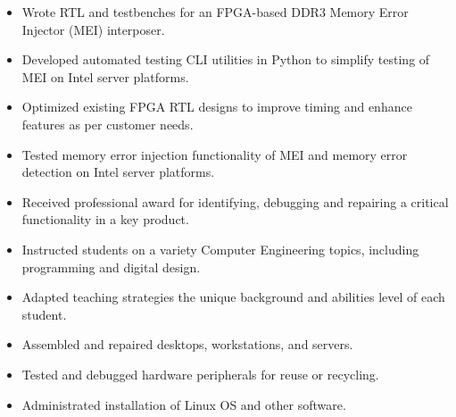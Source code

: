 \documentclass{article}
\begin{document}
\vspace{3pt}


	\begin{itemize}\setlength{\itemsep}{-4pt}
		\item Wrote RTL and testbenches for an FPGA-based DDR3 Memory Error Injector (MEI) interposer.
		\item Developed automated testing CLI utilities in Python to simplify testing of MEI on Intel server platforms.
		\item Optimized existing FPGA RTL designs to improve timing and enhance features as per customer needs.
		\item Tested memory error injection functionality of MEI and memory error detection on Intel server platforms.
		\item Received professional award for identifying, debugging and repairing a critical functionality in a key product.

	\end{itemize} 

	

	\begin{itemize}\setlength{\itemsep}{-4pt}
		\item Instructed students on a variety Computer Engineering topics, including programming and digital design.
		\item Adapted teaching strategies the unique background and abilities level of each student.
	\end{itemize}

	
	
	\begin{itemize} \setlength{\itemsep}{-4pt}
		\item Assembled and repaired desktops, workstations, and servers.
		\item Tested and debugged hardware peripherals for reuse or recycling.		
		\item Administrated installation of Linux OS and other software.
	\end{itemize}
	
	
	
\end{document}
